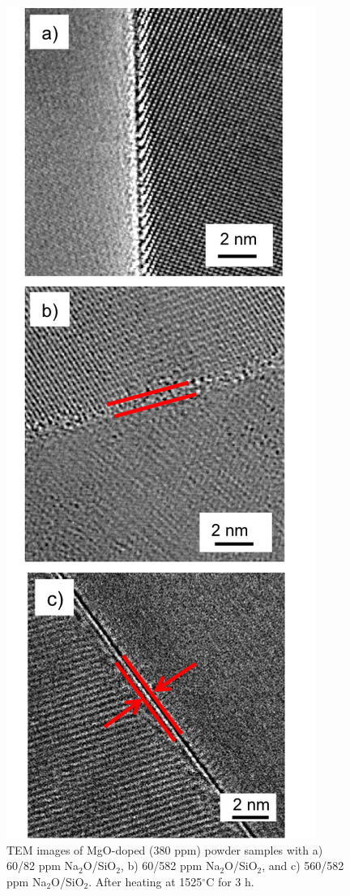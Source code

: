\newpage
\begin{figure}[H]
	\centering
	\includegraphics{Chapter-4/Figures/Figure12.png}
	\caption{TEM images of MgO-doped (380 ppm) powder samples with a) 60/82 ppm Na$_{2}$O/SiO$_{2}$, b) 60/582 ppm Na$_{2}$O/SiO$_{2}$, and c) 560/582 ppm Na$_{2}$O/SiO$_{2}$. After heating at 1525$^{\circ}$C for 3 h.}
	\label{Ch4-figure:Figure12}
\end{figure}
